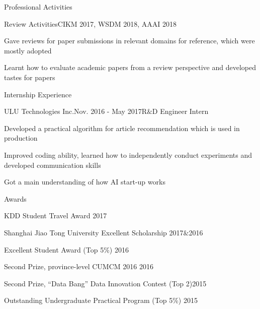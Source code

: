 \documentclass{resume} %
\begin{document}
\begin{rSection}{Professional Activities}
\begin{rSubsection}{Review Activities}{CIKM 2017, WSDM 2018, AAAI 2018}{}{}
\item Gave reviews for paper submissions in relevant domains for reference, which were mostly adopted
\item Learnt how to evaluate academic papers from a review perspective and developed tastes for papers
\end{rSubsection}
\end{rSection}


\begin{rSection}{Internship Experience}
\begin{rSubsection}{ULU Technologies Inc.}{Nov. 2016 - May 2017}{R$\&$D  Engineer Intern}{}
\item Developed a practical algorithm for article recommendation which is used in production
\item Improved coding ability, learned how to independently conduct experiments and developed communication skills
\item Got a main understanding of how AI start-up works
\end{rSubsection}
\end{rSection}



\begin{rSection}{Awards}
\begin{rSubsection}{}{}{}{}
\item KDD Student Travel Award \hfill{2017}
\item Shanghai Jiao Tong University Excellent Scholarship \hfill{2017$\&$2016}
\item Excellent Student Award (Top 5\%)  \hfill{2016}
\item Second Prize, province-level CUMCM 2016 \hfill{2016}
\item Second Prize, ``Data Bang'' Data Innovation Contest (Top 2)\hfill{2015} 
\item Outstanding Undergraduate Practical Program (Top 5\%) \hfill{2015}
\end{rSubsection}
\end{rSection}
\end{document}
